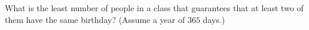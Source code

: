 What is the least number of people in a class that guarantees that at least two of them have the same birthday? (Assume a year of $365$ days.)
